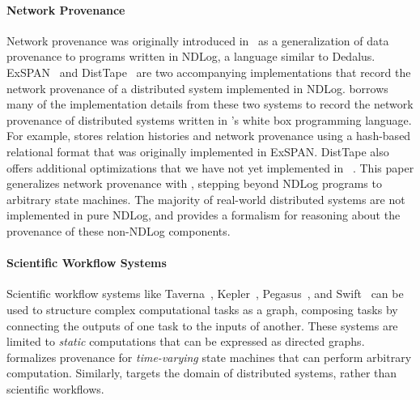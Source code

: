 \paragraph{Network Provenance}
Network provenance was originally introduced in~\cite{zhou2010efficient} as a
generalization of data provenance to programs written in NDLog, a language
similar to Dedalus. ExSPAN~\cite{zhou2010efficient} and
DistTape~\cite{zhou2012distributed} are two accompanying implementations that
record the network provenance of a distributed system implemented in NDLog.
\fluent{} borrows many of the implementation details from these two systems to
record the network provenance of distributed systems written in \fluent{}'s
white box programming language. For example, \fluent{} stores relation
histories and network provenance using a hash-based relational format that was
originally implemented in ExSPAN. DistTape also offers additional optimizations
that we have not yet implemented in \fluent{}~\cite{zhou2012distributed,
chen2017distributed}.
This paper generalizes network provenance with \watprovenance{}, stepping
beyond NDLog programs to arbitrary state machines. The majority of real-world
distributed systems are not implemented in pure NDLog, and \watprovenance{}
provides a formalism for reasoning about the provenance of these non-NDLog
components.

\paragraph{Scientific Workflow Systems}
Scientific workflow systems like Taverna~\cite{wolstencroft2013taverna},
Kepler~\cite{altintas2006provenance}, Pegasus~\cite{kim2008provenance}, and
Swift~\cite{wozniak2013swift} can be used to structure complex computational
tasks as a graph, composing tasks by connecting the outputs of one task to the
inputs of another. These systems are limited to \emph{static} computations that
can be expressed as directed graphs. \watprovenance{} formalizes provenance for
\emph{time-varying} state machines that can perform arbitrary computation.
Similarly, \fluent{} targets the domain of distributed systems, rather than
scientific workflows.

